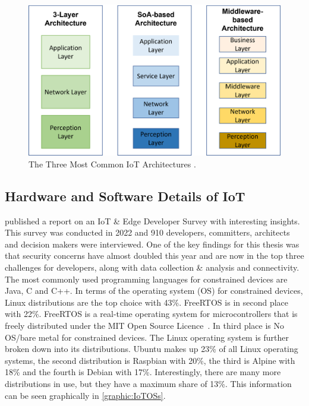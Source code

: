 \begin{figure}[tph]
\includegraphics[scale=0.5]{assets/IoTArchitectures.png}
\centering
\caption{The Three Most Common IoT Architectures \cite{article:Lombardi2021}.}
\label{graphic:IoTArchitecture}
\end{figure}


\subsection{Hardware and Software Details of IoT} \label{sec:hardSoftware}
\cite{website:eclipseIoT} published a report on an IoT \& Edge Developer Survey with interesting insights. This survey was conducted in 2022 and 910 developers, committers, architects and decision makers were interviewed. One of the key findings for this thesis was that security concerns have almost doubled this year and are now in the top three challenges for developers, along with data collection \& analysis and connectivity. The most commonly used programming languages for constrained devices are Java, C and C++. In terms of the operating system (OS) for constrained devices, Linux distributions are the top choice with 43\%. FreeRTOS is in second place with 22\%. FreeRTOS is a real-time operating system for microcontrollers that is freely distributed under the MIT Open Source Licence~\cite{website:freeRTOS}. In third place is No OS/bare metal for constrained devices. The Linux operating system is further broken down into its distributions. Ubuntu makes up 23\% of all Linux operating systems, the second distribution is Raspbian with 20\%, the third is Alpine with 18\% and the fourth is Debian with 17\%. Interestingly, there are many more distributions in use, but they have a maximum share of 13\%. This information can be seen graphically in \ref{graphic:IoTOSs}.


